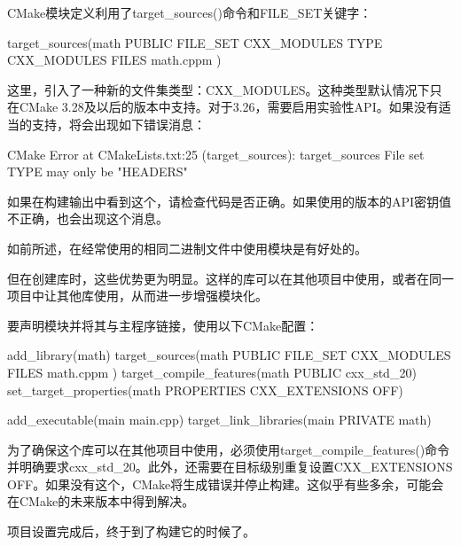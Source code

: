 
CMake模块定义利用了target\_sources()命令和FILE\_SET关键字：

\begin{cmake}
target_sources(math
    PUBLIC FILE_SET CXX_MODULES TYPE CXX_MODULES FILES math.cppm
)
\end{cmake}

这里，引入了一种新的文件集类型：CXX\_MODULES。这种类型默认情况下只在CMake 3.28及以后的版本中支持。对于3.26，需要启用实验性API。如果没有适当的支持，将会出现如下错误消息：

\begin{shell}
CMake Error at CMakeLists.txt:25 (target_sources):
target_sources File set TYPE may only be "HEADERS"
\end{shell}

如果在构建输出中看到这个，请检查代码是否正确。如果使用的版本的API密钥值不正确，也会出现这个消息。

如前所述，在经常使用的相同二进制文件中使用模块是有好处的。

但在创建库时，这些优势更为明显。这样的库可以在其他项目中使用，或者在同一项目中让其他库使用，从而进一步增强模块化。

要声明模块并将其与主程序链接，使用以下CMake配置：


\begin{cmake}
add_library(math)
target_sources(math
    PUBLIC FILE_SET CXX_MODULES FILES math.cppm
)
target_compile_features(math PUBLIC cxx_std_20)
set_target_properties(math PROPERTIES CXX_EXTENSIONS OFF)

add_executable(main main.cpp)
target_link_libraries(main PRIVATE math)
\end{cmake}

为了确保这个库可以在其他项目中使用，必须使用target\_compile\_features()命令并明确要求cxx\_std\_20。此外，还需要在目标级别重复设置CXX\_EXTENSIONS OFF。如果没有这个，CMake将生成错误并停止构建。这似乎有些多余，可能会在CMake的未来版本中得到解决。

项目设置完成后，终于到了构建它的时候了。
